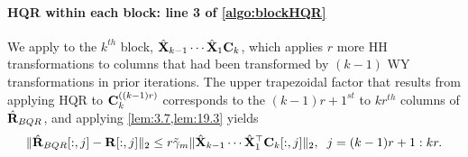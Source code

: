 \paragraph{HQR within each block: line 3 of \cref{algo:blockHQR}}
We apply  to the $k^{th}$ block, $\hat{\mathbf{X}}_{k-1}\cdots\hat{\mathbf{X}}_1\mathbf{C}_k$, which applies $r$ more HH transformations to columns that had been transformed by $(k-1)$ WY transformations in prior iterations.
The upper trapezoidal factor that results from applying HQR to $\mathbf{C}_{k}^{((k-1)r)}$ corresponds to the $(k-1)r+1^{st}$ to $kr^{th}$ columns of $\hat{\mathbf{R}}_{BQR}$, and applying \cref{lem:3.7,lem:19.3} yields
\begin{equation*}
	\|\hat{\bb{R}}_{BQR}[:,j]-\bb{R}[:,j]\|_2 \leq r\tilde{\gamma}_{m}\|\hat{\bb{X}}_{k-1}\cdots\hat{\bb{X}}_1^{\top}\bb{C}_k[:,j]\|_2,\;\; j=(k-1)r+1:kr.%
\end{equation*}
